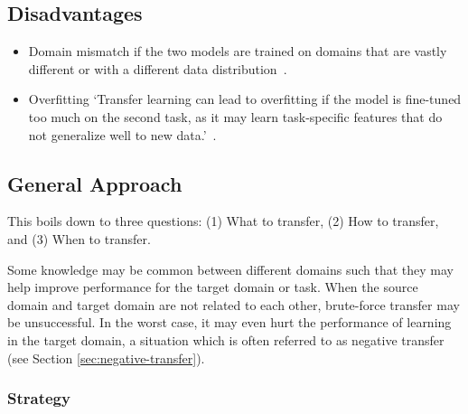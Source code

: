 \documentclass[11pt]{article}
\begin{document}
\subsection{Disadvantages}

\begin{itemize}
    \item Domain mismatch if the two models are trained on domains that are vastly different or with a different data distribution~\cite{geeks-transfer-learning}.
    \item Overfitting `Transfer learning can lead to overfitting if the model is fine-tuned too much on the second task, as it may learn task-specific features that do not generalize well to new data.'~\cite{geeks-transfer-learning}.
\end{itemize}

\subsection{General Approach}

This boils down to three questions: (1) What to transfer, (2) How to transfer, and (3) When to transfer.

Some knowledge may be common between different domains such that they may help improve performance for the target domain or task. When the source domain and target domain are not related to each other, brute-force transfer may be unsuccessful. In the worst case, it may even hurt the performance of learning in the target domain, a situation which is often referred to as negative transfer (see Section \ref{sec:negative-transfer}).

\subsubsection{Strategy}
\end{document}

